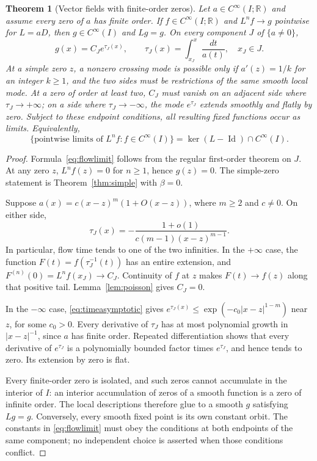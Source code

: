 \documentclass[11pt,reqno]{amsart}
\numberwithin{equation}{section}
\newtheorem{theorem}{Theorem}[section]
\theoremstyle{definition}
\theoremstyle{remark}
\newcommand{\R}{\mathbb R}
\newcommand{\id}{\operatorname{Id}}
\begin{document}
\begin{theorem}[Vector fields with finite-order zeros]\label{thm:finitezeros}
Let $a\in C^\infty(I;\R)$ and assume every zero of $a$ has finite order. If $f\in C^\infty(I;\R)$ and $L^nf\to g$ pointwise for $L=aD$, then $g\in C^\infty(I)$ and $Lg=g$. On every component $J$ of $\{a\ne0\}$,
\begin{equation}\label{eq:flowlimit}
 g(x)=C_J e^{\tau_J(x)},\qquad
 \tau_J(x)=\int_{x_J}^x\frac{dt}{a(t)},\quad x_J\in J.
\end{equation}
At a simple zero $z$, a nonzero crossing mode is possible only if $a'(z)=1/k$ for an integer $k\ge1$, and the two sides must be restrictions of the same smooth local mode. At a zero of order at least two, $C_J$ must vanish on an adjacent side where $\tau_J\to+\infty$; on a side where $\tau_J\to-\infty$, the mode $e^{\tau_J}$ extends smoothly and flatly by zero. Subject to these endpoint conditions, all resulting fixed functions occur as limits. Equivalently,
\[
 \{\text{pointwise limits of }L^nf:f\in C^\infty(I)\}
   =\ker(L-\id)\cap C^\infty(I).
\]
\end{theorem}
\begin{proof}
Formula~\eqref{eq:flowlimit} follows from the regular first-order theorem on $J$. At any zero $z$, $L^nf(z)=0$ for $n\ge1$, hence $g(z)=0$. The simple-zero statement is Theorem~\ref{thm:simple} with $\beta=0$.

Suppose $a(x)=c(x-z)^m(1+O(x-z))$, where $m\ge2$ and $c\ne0$. On either side,
\begin{equation}\label{eq:timeasymptotic}
 \tau_J(x)=-\frac{1+o(1)}{c(m-1)(x-z)^{m-1}}.
\end{equation}
In particular, flow time tends to one of the two infinities. In the $+\infty$ case, the function $F(t)=f(\tau_J^{-1}(t))$ has an entire extension, and $F^{(n)}(0)=L^nf(x_J)\to C_J$. Continuity of $f$ at $z$ makes $F(t)\to f(z)$ along that positive tail. Lemma~\ref{lem:poisson} gives $C_J=0$.

In the $-\infty$ case, \eqref{eq:timeasymptotic} gives $e^{\tau_J(x)}\le \exp(-c_0|x-z|^{1-m})$ near $z$, for some $c_0>0$. Every derivative of $\tau_J$ has at most polynomial growth in $|x-z|^{-1}$, since $a$ has finite order. Repeated differentiation shows that every derivative of $e^{\tau_J}$ is a polynomially bounded factor times $e^{\tau_J}$, and hence tends to zero. Its extension by zero is flat.

Every finite-order zero is isolated, and such zeros cannot accumulate in the interior of $I$: an interior accumulation of zeros of a smooth function is a zero of infinite order. The local descriptions therefore glue to a smooth $g$ satisfying $Lg=g$. Conversely, every smooth fixed point is its own constant orbit. The constants in \eqref{eq:flowlimit} must obey the conditions at both endpoints of the same component; no independent choice is asserted when those conditions conflict.
\end{proof}
\end{document}
